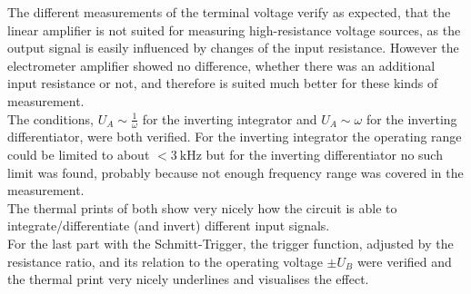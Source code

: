 \noindent
The different measurements of the terminal voltage verify as expected, that the linear amplifier is not suited for measuring high-resistance voltage sources, as the output signal is easily influenced by changes
of the input resistance. However the electrometer amplifier showed no difference, whether there was an additional input resistance or not, and therefore is suited much better for these kinds of measurement. \\
\newline
\noindent
The conditions, $U_A \sim \frac{1}{\omega}$ for the inverting integrator and $U_A \sim \omega$ for the inverting differentiator, were both verified. For the inverting integrator the operating range could be limited
to about $<\SI{3}{\kilo\hertz}$ but for the inverting differentiator no such limit was found, probably because not enough frequency range was covered in the measurement. \\
The thermal prints of both show very nicely how the circuit is able to integrate/differentiate (and invert) different input signals.\\
\newline
\noindent
For the last part with the Schmitt-Trigger, the trigger function, adjusted by the resistance ratio, and its relation to the operating voltage $\pm U_B$ were verified
and the thermal print very nicely underlines and visualises the effect.
